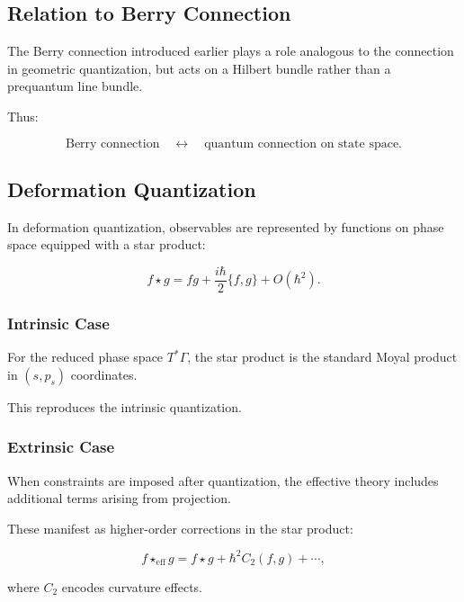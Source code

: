 \documentclass[11pt]{article}
\begin{document}
\subsection{Relation to Berry Connection}

The Berry connection introduced earlier plays a role analogous to the connection in geometric quantization, but acts on a Hilbert bundle rather than a prequantum line bundle.

Thus:

\begin{equation}
\text{Berry connection} \quad \leftrightarrow \quad \text{quantum connection on state space}.
\end{equation}

\subsection{Deformation Quantization}

In deformation quantization, observables are represented by functions on phase space equipped with a star product:

\begin{equation}
f \star g = fg + \frac{i\hbar}{2}\{f,g\} + O(\hbar^2).
\end{equation}

\subsubsection{Intrinsic Case}

For the reduced phase space $T^*\Gamma$, the star product is the standard Moyal product in $(s,p_s)$ coordinates.

This reproduces the intrinsic quantization.

\subsubsection{Extrinsic Case}

When constraints are imposed after quantization, the effective theory includes additional terms arising from projection.

These manifest as higher-order corrections in the star product:

\begin{equation}
f \star_{\mathrm{eff}} g
= f \star g + \hbar^2 C_2(f,g) + \cdots,
\end{equation}

where $C_2$ encodes curvature effects.
\end{document}
